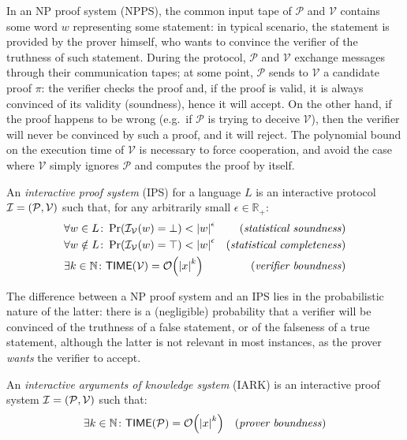 In an \textsc{NP} proof system (\textsc{NP}PS), the common input tape of \(\mathcal{P}\) and 
\(\mathcal{V}\) contains some word \(w\) representing some statement: in typical scenario, the 
statement is provided by the prover himself, who wants to convince the verifier of the truthness of 
such statement.
During the protocol, \(\mathcal{P}\) and \(\mathcal{V}\) exchange messages through their 
communication tapes; at some point, \(\mathcal{P}\) sends to \(\mathcal{V}\) a candidate proof 
\(\pi \): the verifier checks the proof and, if the proof is valid, it is always convinced of its 
validity (soundness), hence it will accept. 
On the other hand, if the proof happens to be wrong (e.g.\ if \(\mathcal{P}\) is trying to deceive
\(\mathcal{V}\)), then the verifier will never be convinced by such a proof, and it will reject.
The polynomial bound on the execution time of \(\mathcal{V}\) is necessary to force cooperation, 
and avoid the case where \(\mathcal{V}\) simply ignores \(\mathcal{P}\) and computes the proof by 
itself.
\begin{definition}  
  An \emph{interactive proof system} (IPS) for a language \(L\) is an interactive protocol 
  \(\mathcal{I} = \left(\mathcal{P}, \mathcal{V}\right)\) such that, for any arbitrarily small 
  \(\epsilon \in \mathbb{R}_{+}\):
  \begin{align*}
    & \forall w \in L\colon \call{\Pr}{\call{\mathcal{I}_{\mathcal{V}}}{w} = \bot} < \abs{w}^{\epsilon}  
      & \textnormal{(\emph{statistical soundness})} \\
    & \forall w \notin L\colon \call{\Pr}{\call{\mathcal{I}_{\mathcal{V}}}{w} = \top} < \abs{w}^{\epsilon} 
      & \textnormal{(\emph{statistical completeness})} \\
    & \exists k \in \mathbb{N}\colon \call{\Time}{\mathcal{V}} = \BigO{\abs{x}^k} & 
    \textnormal{(\emph{verifier boundness})}
  \end{align*}
\end{definition}

The difference between a NP proof system and an IPS lies 
in the probabilistic nature of the latter: there is a (negligible) probability that a verifier 
will be convinced of the truthness of a false statement, or of the falseness of a true statement, 
although the latter is not relevant in most instances, as the prover \emph{wants} the verifier 
to accept.
\begin{definition}
  An \emph{interactive arguments of knowledge system} (IARK) is an interactive proof system 
  \(\mathcal{I} = \left(\mathcal{P}, \mathcal{V}\right)\) such that:
  \begin{align*}
    & \exists k \in \mathbb{N}\colon \call{\Time}{\mathcal{P}} = \BigO{\abs{x}^k} & 
    \textnormal{(\emph{prover boundness})}
  \end{align*}
\end{definition}

